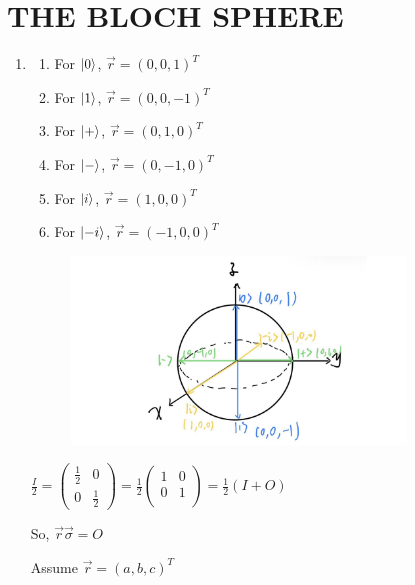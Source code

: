 \documentclass{article}
\begin{document}
\section*{THE BLOCH SPHERE}
\begin{enumerate}
    \item \begin{enumerate}
              \item For $\ket{0}$, $\vec{r}=(0,0,1)^T$
              \item For $\ket{1}$, $\vec{r}=(0,0,-1)^T$
              \item For $\ket{+}$, $\vec{r}=(0,1,0)^T$
              \item For $\ket{-}$, $\vec{r}=(0,-1,0)^T$
              \item For $\ket{i}$, $\vec{r}=(1,0,0)^T$
              \item For $\ket{-i}$, $\vec{r}=(-1,0,0)^T$
          \end{enumerate}
          \begin{figure}
              \centering
              \includegraphics[height=5cm]{BS.pdf}
          \end{figure}
          $\frac{I}{2}=
              \left(
              \begin{array}{cc}
                      \frac{1}{2} & 0 \\0&\frac{1}{2}
                  \end{array}
              \right)
              =\frac{1}{2}\left(
              \begin{array}{cc}
                      1 & 0 \\0&1\\
                  \end{array}
              \right)
              =\frac{1}{2}(I+O)
          $

          So, $\vec{r}\vec{\sigma}=O$

          Assume $\vec{r}=(a,b,c)^T$


\end{enumerate}
\end{document}
